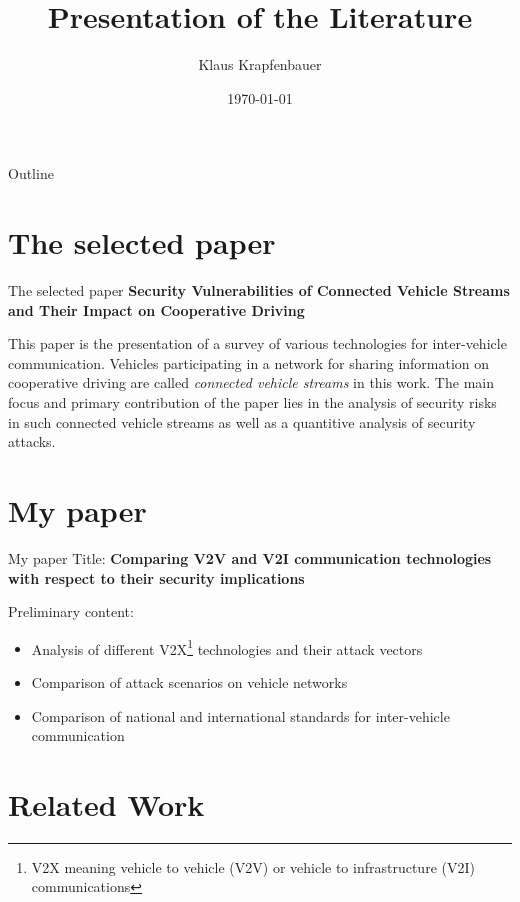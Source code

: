 \documentclass[]{beamer} %
\title{Presentation of the Literature}
\author{Klaus Krapfenbauer}
\date{\today}
\begin{document}
\maketitle

\begin{frame}[t]{Outline}
	\begin{minipage}[t][10em][t]{\linewidth}
		\tableofcontents
	\end{minipage}
\end{frame}

\section{The selected paper}

\begin{frame}{The selected paper}
	\textbf{Security Vulnerabilities of Connected Vehicle Streams and Their Impact on Cooperative Driving}

	This paper is the presentation of a survey of various technologies for inter-vehicle
	communication. Vehicles participating in a network for sharing information on cooperative
	driving are called \emph{connected vehicle streams} in this work. The main focus and
	primary contribution of the paper lies in the analysis of security risks in such
	connected vehicle streams as well as a quantitive analysis of security attacks.
\end{frame}

\section{My paper}

\begin{frame}{My paper}
	Title: \textbf{Comparing V2V and V2I communication technologies with respect to their security implications}
	
	Preliminary content:
	\begin{itemize}
		\item Analysis of different V2X\footnote{V2X meaning vehicle to vehicle (V2V) or vehicle to infrastructure (V2I) communications} technologies and their attack vectors
		\item Comparison of attack scenarios on vehicle networks
		\item Comparison of national and international standards for inter-vehicle communication
	\end{itemize}
\end{frame}

\section{Related Work}
\end{document}
